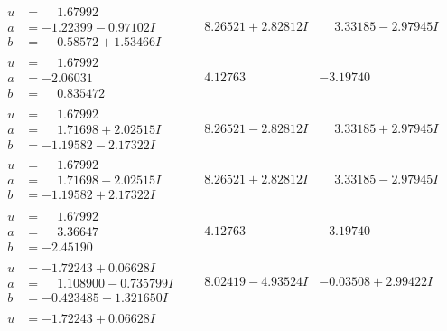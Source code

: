 \documentclass[1p]{elsarticle_modified}
\theoremstyle{definition}
\begin{document}
$$\begin{array}{c|c|c}
\begin{aligned}
u &= \phantom{-}1.67992\phantom{ +0.000000I} \\
a &= -1.22399 - 0.97102 I \\
b &= \phantom{-}0.58572 + 1.53466 I\end{aligned}
 & \phantom{-}8.26521 + 2.82812 I & \phantom{-}3.33185 - 2.97945 I \\ \hline\begin{aligned}
u &= \phantom{-}1.67992\phantom{ +0.000000I} \\
a &= -2.06031\phantom{ +0.000000I} \\
b &= \phantom{-}0.835472\phantom{ +0.000000I}\end{aligned}
 & \phantom{-}4.12763\phantom{ +0.000000I} & -3.19740\phantom{ +0.000000I} \\ \hline\begin{aligned}
u &= \phantom{-}1.67992\phantom{ +0.000000I} \\
a &= \phantom{-}1.71698 + 2.02515 I \\
b &= -1.19582 - 2.17322 I\end{aligned}
 & \phantom{-}8.26521 - 2.82812 I & \phantom{-}3.33185 + 2.97945 I \\ \hline\begin{aligned}
u &= \phantom{-}1.67992\phantom{ +0.000000I} \\
a &= \phantom{-}1.71698 - 2.02515 I \\
b &= -1.19582 + 2.17322 I\end{aligned}
 & \phantom{-}8.26521 + 2.82812 I & \phantom{-}3.33185 - 2.97945 I \\ \hline\begin{aligned}
u &= \phantom{-}1.67992\phantom{ +0.000000I} \\
a &= \phantom{-}3.36647\phantom{ +0.000000I} \\
b &= -2.45190\phantom{ +0.000000I}\end{aligned}
 & \phantom{-}4.12763\phantom{ +0.000000I} & -3.19740\phantom{ +0.000000I} \\ \hline\begin{aligned}
u &= -1.72243 + 0.06628 I \\
a &= \phantom{-}1.108900 - 0.735799 I \\
b &= -0.423485 + 1.321650 I\end{aligned}
 & \phantom{-}8.02419 - 4.93524 I & -0.03508 + 2.99422 I \\ \hline\begin{aligned}
u &= -1.72243 + 0.06628 I \\

\end{aligned}
\end{array}$$
\end{document}
